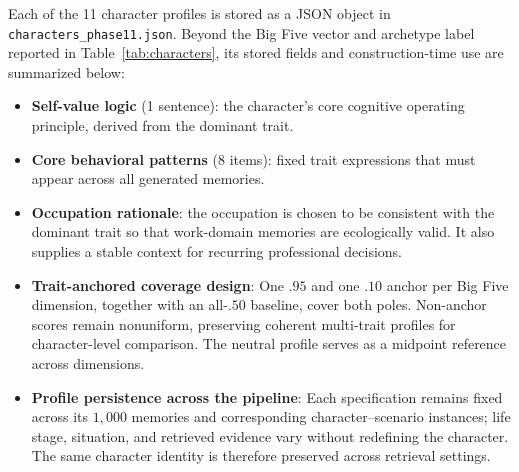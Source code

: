 \documentclass[11pt]{article}
\begin{document}
Each of the 11 character profiles is stored as a JSON object in \texttt{characters\_phase11.json}. Beyond the Big Five vector and archetype label reported in Table~\ref{tab:characters}, its stored fields and construction-time use are summarized below:

\begin{itemize}[leftmargin=1.5em, itemsep=2pt]
  \item \textbf{Self-value logic} (1 sentence): the character's core cognitive operating principle, derived from the dominant trait.
  \item \textbf{Core behavioral patterns} (8 items): fixed trait expressions that must appear across all generated memories.
  \item \textbf{Occupation rationale}: the occupation is chosen to be consistent with the dominant trait so that work-domain memories are ecologically valid. It also supplies a stable context for recurring professional decisions.
  \item \textbf{Trait-anchored coverage design}: One $.95$ and one $.10$ anchor per Big Five dimension, together with an all-$.50$ baseline, cover both poles. Non-anchor scores remain nonuniform, preserving coherent multi-trait profiles for character-level comparison. The neutral profile serves as a midpoint reference across dimensions.
  \item \textbf{Profile persistence across the pipeline}: Each specification remains fixed across its $1{,}000$ memories and corresponding character--scenario instances; life stage, situation, and retrieved evidence vary without redefining the character. The same character identity is therefore preserved across retrieval settings.
\end{itemize}
\end{document}
